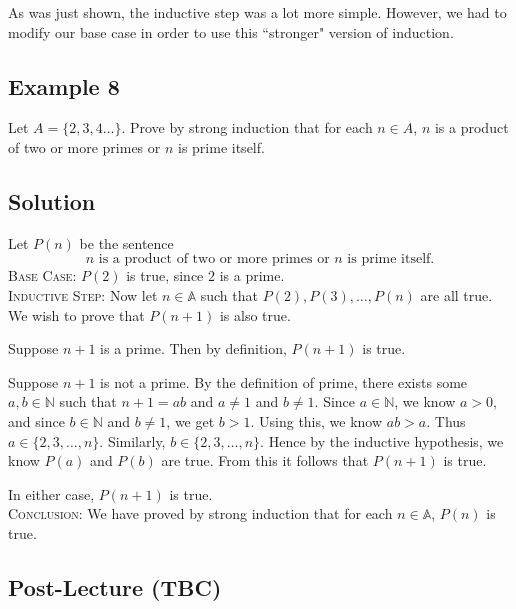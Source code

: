 \documentclass{article}
\begin{document}
    \vspace{1.5mm}
    As was just shown, the inductive step was a lot more simple. However, we had to modify our base case in order to use this ``stronger" version of induction.

\subsection*{Example 8}
    Let $A = \{2, 3, 4 \dots\}$. Prove by strong induction that for each $n \in A$, $n$ is a product of two or more primes or $n$ is prime itself.

\subsection*{Solution}
    Let $P(n)$ be the sentence $$\text{$n$ is a product of two or more primes or $n$ is prime itself}.$$
    \textsc{Base Case}: $P(2)$ is true, since $2$ is a prime. \\
    \textsc{Inductive Step}: Now let $n \in \mathbb{A}$ such that $P(2), P(3), \dots, P(n)$ are all true. We wish to prove that $P(n + 1)$ is also true.
    
    \begin{Cases}
        \item Suppose $n + 1$ is a prime. Then by definition, $P(n + 1)$ is true.
        \item Suppose $n + 1$ is not a prime. By the definition of prime, there exists some $a, b \in \mathbb{N}$ such that $n + 1 = ab$ and $a \ne 1$ and $b \ne 1$. Since $a \in \mathbb{N}$, we know $a > 0$, and since $b \in \mathbb{N}$ and $b \ne 1$, we get $b > 1$. Using this, we know $ab > a$. Thus $a \in \{2, 3, \dots, n\}$. Similarly, $b \in \{2, 3, \dots, n\}$. Hence by the inductive hypothesis, we know $P(a)$ and $P(b)$ are true. From this it follows that $P(n + 1)$ is true.
    \end{Cases}
    In either case, $P(n + 1)$ is true. \\
    \textsc{Conclusion}: We have proved by strong induction that for each $n \in \mathbb{A}$, $P(n)$ is true.

\subsection*{Post-Lecture (TBC)}
\end{document}
